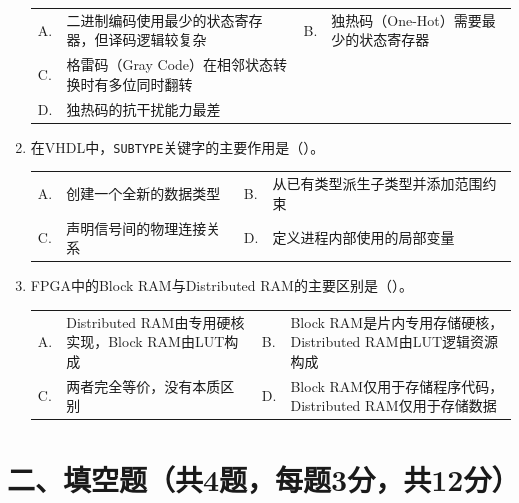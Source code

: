 \begin{enumerate}[label=\arabic*.]
\vspace{0.3cm}

\begin{tabular}{@{}lp{}@{\qquad}lp{}@{}}
A. & 二进制编码使用最少的状态寄存器，但译码逻辑较复杂 &
B. & 独热码（One-Hot）需要最少的状态寄存器 \\
C. & 格雷码（Gray Code）在相邻状态转换时有多位同时翻转 \\
D. & 独热码的抗干扰能力最差 \\
\end{tabular}

\vspace{0.8cm}

\item 在VHDL中，\texttt{SUBTYPE}关键字的主要作用是（\quad）。

\vspace{0.3cm}

\begin{tabular}{@{}lp{}@{\qquad}lp{}@{}}
A. & 创建一个全新的数据类型 &
B. & 从已有类型派生子类型并添加范围约束 \\
C. & 声明信号间的物理连接关系 &
D. & 定义进程内部使用的局部变量 \\
\end{tabular}

\vspace{0.8cm}

\item FPGA中的Block RAM与Distributed RAM的主要区别是（\quad）。

\vspace{0.3cm}

\begin{tabular}{@{}lp{}@{\qquad}lp{}@{}}
A. & Distributed RAM由专用硬核实现，Block RAM由LUT构成 &
B. & Block RAM是片内专用存储硬核，Distributed RAM由LUT逻辑资源构成 \\
C. & 两者完全等价，没有本质区别 &
D. & Block RAM仅用于存储程序代码，Distributed RAM仅用于存储数据 \\
\end{tabular}

\end{enumerate}

\newpage

\section*{二、填空题（共4题，每题3分，共12分）}

